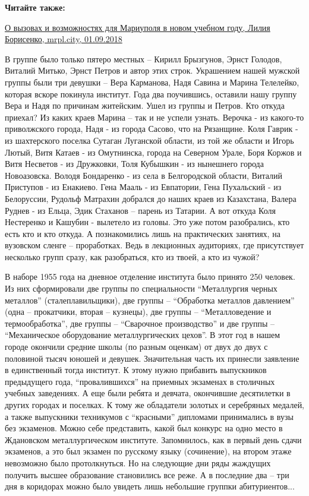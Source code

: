\textbf{Читайте также:} 

\href{https://mrpl.city/blogs/view/o-vyzovah-i-vozmozhnostyah-dlya-mariupolya-v-novom-uchebnom-godu}{%
О вызовах и возможностях для Мариуполя в новом учебном году, Лилия Борисенко, mrpl.city, 01.09.2018}

В группе было только пятеро местных – Кирилл Брызгунов, Эрнст Голодов, Виталий
Митько, Эрнст Петров и автор этих строк. Украшением нашей мужской группы были
три девушки – Вера Карманова, Надя Савина и Марина Телелейко, которая вскоре
покинула институт. Года два поучившись, оставили нашу группу Вера и Надя по
причинам житейским. Ушел из группы и Петров. Кто откуда приехал? Из каких краев
Марина – так и не успели узнать. Верочка - из какого-то приволжского города,
Надя - из города Сасово, что на Рязанщине. Коля Гаврик - из шахтерского поселка
Сутаган Луганской области, из той же области и Игорь Лютый, Витя Катаев - из
Омутнинска, города на Северном Урале, Боря Коржов и Витя Несветов - из
Дружковки, Толя Кубышкин - из нынешнего города Новоазовска. Володя Бондаренко -
из села в Белгородской области, Виталий Приступов - из Енакиево. Гена Мааль -
из Евпатории, Гена Пухальский - из Белоруссии, Рудольф Матрахин добрался до
наших краев из Казахстана, Валера Руднев -  из Ельца, Эдик Стаханов – парень из
Татарии. А вот откуда Коля Нестеренко и Кашубин - вылетело из головы. Это уже
потом разобрались, кто есть кто и кто откуда. А познакомились лишь на
практических занятиях, на вузовском сленге – проработках. Ведь в лекционных
аудиториях, где присутствует несколько групп сразу, как разобраться, кто из
твоей, а кто из чужой?

В наборе 1955 года на дневное отделение института было принято 250 человек. Из
них сформировали две группы по специальности \enquote{Металлургия черных металлов}
(сталеплавильщики), две группы – \enquote{Обработка металлов давлением} (одна –
прокатчики, вторая – кузнецы), две группы – \enquote{Металловедение и термообработка},
две группы – \enquote{Сварочное производство} и две группы – \enquote{Механическое оборудование
металлургических цехов}. В этот год в нашем городе окончили средние школы (по
разным оценкам) от двух до двух с половиной тысяч юношей и девушек.
Значительная часть их принесли заявление в единственный тогда институт. К этому
нужно прибавить выпускников предыдущего года, \enquote{провалившихся} на приемных
экзаменах в столичных учебных заведениях. А еще были ребята и девчата,
окончившие десятилетки в других городах и поселках. К тому же обладатели
золотых и серебряных медалей, а также выпускники техникумов с \enquote{красными}
дипломами принимались в вузы без экзаменов. Можно себе представить, какой был
конкурс на одно место в Ждановском металлургическом институте. Запомнилось, как
в первый день сдачи экзаменов, а это был экзамен по русскому языку (сочинение),
на втором этаже невозможно было протолкнуться. Но на следующие дни ряды
жаждущих получить высшее образование становились все реже. А в последние два –
три дня в коридорах можно было увидеть лишь небольшие группки абитуриентов...

